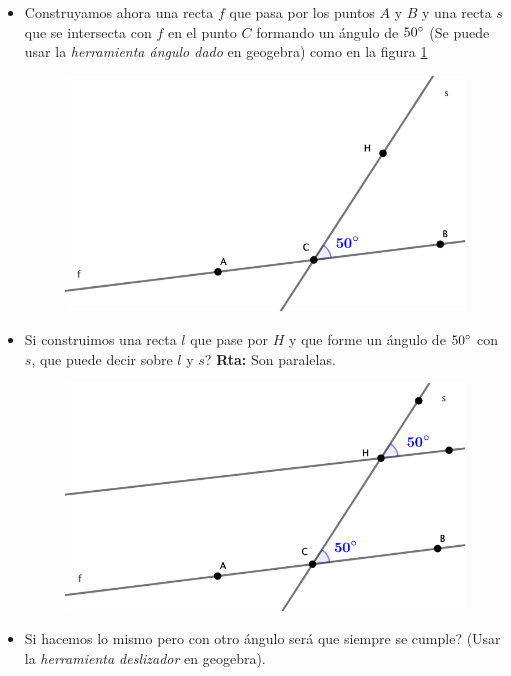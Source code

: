 \begin{itemize}
	\item Construyamos ahora una recta $f$ que pasa por los puntos $A$ y $B$ y una recta $s$ que se intersecta con $f$ en el punto $C$ formando un ángulo de $50\degree$ (Se puede usar la \textit{herramienta ángulo dado} en geogebra) como en la figura \ref{recta_y_secante_a_50_grados}
	\begin{figure}[H]
		\centering
		\includegraphics[width=0.6\linewidth]{Geometria/imgs/recta_y_secante_a_50_grados}
		\label{recta_y_secante_a_50_grados}
	\end{figure}
	\item Si construimos una recta $l$ que pase por $H$ y que forme un ángulo de $50\degree $ con $s$, que puede decir sobre $l$ y $s$? \textbf{Rta: } Son paralelas.
	\begin{figure}[H]
		\centering
		\includegraphics[width=0.6\linewidth]{Geometria/imgs/si_angulos_entonces_son_paralelas}
		\label{si_angulos_entonces_son_paralelas}
	\end{figure}			
	\item Si hacemos lo mismo pero con otro ángulo será que siempre se cumple? (Usar la \textit{herramienta deslizador} en geogebra).
\end{itemize}


